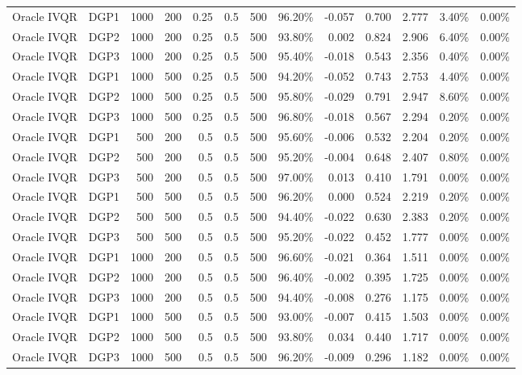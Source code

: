\begin{landscape}
\begin{longtable}{llrrrrrrrrrrr}
Oracle IVQR & DGP1 & 1000 & 200 & 0.25 & 0.5 & 500 & 96.20\% & -0.057 & 0.700 & 2.777 & 3.40\% & 0.00\% \\
Oracle IVQR & DGP2 & 1000 & 200 & 0.25 & 0.5 & 500 & 93.80\% & 0.002 & 0.824 & 2.906 & 6.40\% & 0.00\% \\
Oracle IVQR & DGP3 & 1000 & 200 & 0.25 & 0.5 & 500 & 95.40\% & -0.018 & 0.543 & 2.356 & 0.40\% & 0.00\% \\
Oracle IVQR & DGP1 & 1000 & 500 & 0.25 & 0.5 & 500 & 94.20\% & -0.052 & 0.743 & 2.753 & 4.40\% & 0.00\% \\
Oracle IVQR & DGP2 & 1000 & 500 & 0.25 & 0.5 & 500 & 95.80\% & -0.029 & 0.791 & 2.947 & 8.60\% & 0.00\% \\
Oracle IVQR & DGP3 & 1000 & 500 & 0.25 & 0.5 & 500 & 96.80\% & -0.018 & 0.567 & 2.294 & 0.20\% & 0.00\% \\
Oracle IVQR & DGP1 & 500 & 200 & 0.5 & 0.5 & 500 & 95.60\% & -0.006 & 0.532 & 2.204 & 0.20\% & 0.00\% \\
Oracle IVQR & DGP2 & 500 & 200 & 0.5 & 0.5 & 500 & 95.20\% & -0.004 & 0.648 & 2.407 & 0.80\% & 0.00\% \\
Oracle IVQR & DGP3 & 500 & 200 & 0.5 & 0.5 & 500 & 97.00\% & 0.013 & 0.410 & 1.791 & 0.00\% & 0.00\% \\
Oracle IVQR & DGP1 & 500 & 500 & 0.5 & 0.5 & 500 & 96.20\% & 0.000 & 0.524 & 2.219 & 0.20\% & 0.00\% \\
Oracle IVQR & DGP2 & 500 & 500 & 0.5 & 0.5 & 500 & 94.40\% & -0.022 & 0.630 & 2.383 & 0.20\% & 0.00\% \\
Oracle IVQR & DGP3 & 500 & 500 & 0.5 & 0.5 & 500 & 95.20\% & -0.022 & 0.452 & 1.777 & 0.00\% & 0.00\% \\
Oracle IVQR & DGP1 & 1000 & 200 & 0.5 & 0.5 & 500 & 96.60\% & -0.021 & 0.364 & 1.511 & 0.00\% & 0.00\% \\
Oracle IVQR & DGP2 & 1000 & 200 & 0.5 & 0.5 & 500 & 96.40\% & -0.002 & 0.395 & 1.725 & 0.00\% & 0.00\% \\
Oracle IVQR & DGP3 & 1000 & 200 & 0.5 & 0.5 & 500 & 94.40\% & -0.008 & 0.276 & 1.175 & 0.00\% & 0.00\% \\
Oracle IVQR & DGP1 & 1000 & 500 & 0.5 & 0.5 & 500 & 93.00\% & -0.007 & 0.415 & 1.503 & 0.00\% & 0.00\% \\
Oracle IVQR & DGP2 & 1000 & 500 & 0.5 & 0.5 & 500 & 93.80\% & 0.034 & 0.440 & 1.717 & 0.00\% & 0.00\% \\
Oracle IVQR & DGP3 & 1000 & 500 & 0.5 & 0.5 & 500 & 96.20\% & -0.009 & 0.296 & 1.182 & 0.00\% & 0.00\% \\

\end{longtable}
\end{landscape}

